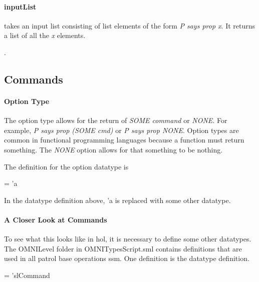 \documentclass[../../main/main.tex]{subfiles}
\begin{document}
\paragraph*{inputList}
 takes an input list consisting of list elements of the form \textit{P says prop x}.  It returns a list of all the \textit{x} elements.
\begin{tabbing}
\parskip=8pt
\HOLTokenTurnstile{} \HOLSymConst{\HOLTokenForall{}}. \\
\hspace{0.3cm}   \HOLSymConst{=}   
\parskip=18pt
\end{tabbing}


\subsection{Commands}
\paragraph*{Option Type}\label{option}
The option type allows for the return of \textit{SOME command} or \textit{NONE}.  For example, \textit{P says prop (SOME cmd)} or \textit{P says prop NONE}.  Option types are common in functional programming languages because a function must return something.  The \textit{NONE} option allows for that something to be nothing.


The definition for the option datatype is

 =  \HOLTokenBar{}  'a

In the datatype definition above, 'a is replaced with some other datatype.  

\paragraph*{A Closer Look at Commands}
To see what this looks like in \gls{hol}, it is necessary to define some other datatypes. The OMNILevel folder in OMNITypesScript.sml contains definitions that are used in all patrol base operations \gls{ssm}. One definition is the  datatype definition.

\begin{tabbing}
 =   \HOLTokenBar{}  'slCommand
\end{tabbing}
\end{document}
